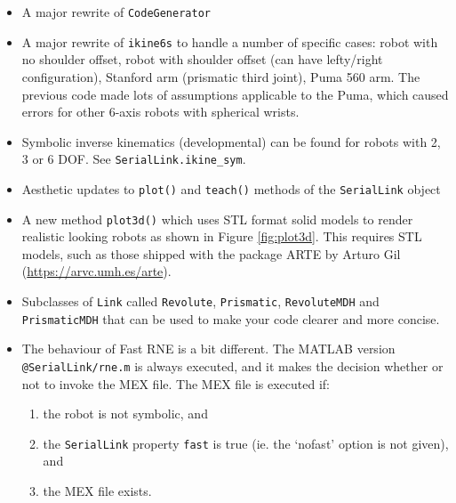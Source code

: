 \documentclass[a4paper]{report}
\begin{document}
\begin{itemize}
\item A major rewrite of \texttt{CodeGenerator}
\item A major rewrite of \texttt{ikine6s} to handle a number of specific cases: robot with no shoulder offset, robot with
shoulder offset (can have lefty/right configuration), Stanford arm (prismatic third joint), Puma 560 arm.  The previous code made lots
of assumptions applicable to the Puma, which caused errors for other 6-axis robots with spherical wrists.
\item Symbolic inverse kinematics (developmental) can be found for robots with 2, 3 or 6 DOF.  See \texttt{SerialLink.ikine\_sym}.
\item Aesthetic updates to \texttt{plot()} and \texttt{teach()} methods of the \texttt{SerialLink} object

\item A new method \texttt{plot3d()} which uses STL format solid models to render realistic looking robots as shown in Figure
\ref{fig:plot3d}.  This requires STL models,
such as those shipped with the package ARTE by Arturo Gil (\url{https://arvc.umh.es/arte}).

\item Subclasses of \texttt{Link} called \texttt{Revolute}, \texttt{Prismatic}, \texttt{RevoluteMDH} and \texttt{PrismaticMDH} that can be used to make your
code clearer and more concise.
\item The behaviour of Fast RNE is a bit different.  The MATLAB version \texttt{@SerialLink/rne.m} is always executed, and it makes
the decision whether or not to invoke the MEX file.  The MEX file is executed if:
	\begin{enumerate}
	\item the robot is not symbolic, and
	\item the \texttt{SerialLink} property \texttt{fast} is true (ie. the `nofast' option is not given), and
	\item the MEX file exists.
	\end{enumerate}
	

\end{itemize}
\end{document}
